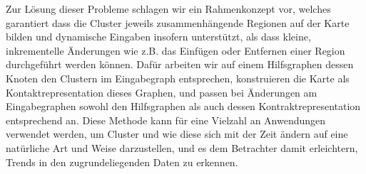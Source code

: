 \begin{addmargin}{0.5cm}
Zur Lösung dieser Probleme schlagen wir ein Rahmenkonzept vor, welches garantiert dass die Cluster jeweils zusammenhängende Regionen auf der Karte bilden und dynamische Eingaben insofern unterstützt, als dass kleine, inkrementelle Änderungen wie z.B. das Einfügen oder Entfernen einer Region durchgeführt werden können.
Dafür arbeiten wir auf einem Hilfsgraphen dessen Knoten den Clustern im Eingabegraph entsprechen, konstruieren die Karte als Kontaktrepresentation dieses Graphen, und passen bei Änderungen am Eingabegraphen sowohl den Hilfsgraphen als auch dessen Kontraktrepresentation entsprechend an.
Diese Methode kann für eine Vielzahl an Anwendungen verwendet werden, um Cluster und wie diese sich mit der Zeit ändern auf eine natürliche Art und Weise darzustellen, und es dem Betrachter damit erleichtern, Trends in den zugrundeliegenden Daten zu erkennen.

\end{addmargin}

